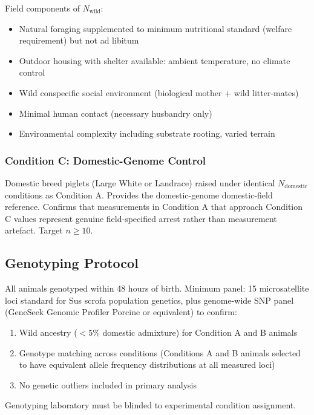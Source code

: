 \documentclass[10pt, a4paper]{article}
\begin{document}
Field components of $N_{\text{wild}}$:
\begin{itemize}[itemsep=0.1em]
  \item Natural foraging supplemented to minimum
    nutritional standard (welfare requirement)
    but not ad libitum
  \item Outdoor housing with shelter available:
    ambient temperature, no climate control
  \item Wild conspecific social environment
    (biological mother + wild litter-mates)
  \item Minimal human contact (necessary
    husbandry only)
  \item Environmental complexity including substrate
    rooting, varied terrain
\end{itemize}

\subsubsection{Condition C: Domestic-Genome Control}

Domestic breed piglets (Large White or Landrace)
raised under identical $N_{\text{domestic}}$
conditions as Condition A. Provides the
domestic-genome domestic-field reference.
Confirms that measurements in Condition A that
approach Condition C values represent genuine
field-specified arrest rather than measurement
artefact. Target $n \geq 10$.

\subsection{Genotyping Protocol}

All animals genotyped within 48 hours of birth.
Minimum panel: 15 microsatellite loci standard
for Sus scrofa population genetics, plus
genome-wide SNP panel (GeneSeek Genomic
Profiler Porcine or equivalent) to confirm:
\begin{enumerate}[itemsep=0.1em]
  \item Wild ancestry ($< 5\%$ domestic admixture)
    for Condition A and B animals
  \item Genotype matching across conditions
    (Conditions A and B animals selected to have
    equivalent allele frequency distributions
    at all measured loci)
  \item No genetic outliers included in primary
    analysis
\end{enumerate}

Genotyping laboratory must be blinded to
experimental condition assignment.
\end{document}
